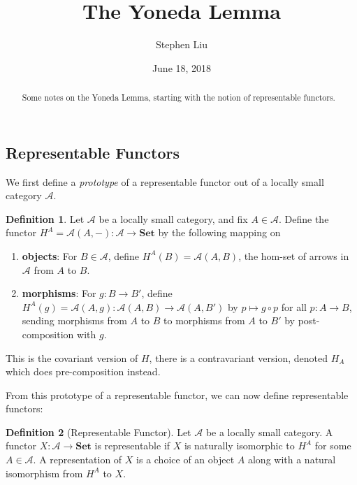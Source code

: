 \documentclass[11pt]{article}
\theoremstyle{definition}
\newtheorem*{defn}{Definition}
\theoremstyle{definition}
\theoremstyle{plain}
\theoremstyle{plain}
\theoremstyle{plain}
\begin{document}
\author{Stephen Liu}
\title{The Yoneda Lemma}
\date{June 18, 2018}

\maketitle

\begin{abstract}
Some notes on the Yoneda Lemma, starting with the notion of representable functors.
\end{abstract}

\subsection*{Representable Functors}

We first define a \emph{prototype} of a representable functor out of a locally small category $\mathscr{A}$.

\begin{defn}
Let $\mathscr{A}$ be a locally small category, and fix $A \in \mathscr{A}$. Define the functor $H^{A}=\mathscr{A}(A, -): \mathscr{A} \to \textbf{Set}$ by the following mapping on

\begin{enumerate}
\item \textbf{objects}: For $B \in \mathscr{A}$, define $H^{A}(B) = \mathscr{A}(A,B)$, the hom-set of arrows in $\mathscr{A}$ from $A$ to $B$.
\item \textbf{morphisms}: For $g:B \to B'$, define $H^{A}(g) = \mathscr{A}(A, g): \mathscr{A}(A,B) \to \mathscr{A}(A,B')$ by $p \mapsto g \circ p$ for all $p : A \to B$, sending morphisms from $A$ to $B$ to morphisms from $A$ to $B'$ by post-composition with $g$.
\end{enumerate}
\end{defn}

This is the covariant version of $H$, there is a contravariant version, denoted $H_{A}$ which does pre-composition instead.

From this prototype of a representable functor, we can now define representable functors:

\begin{defn}[Representable Functor]
Let $\mathscr{A}$ be a locally small category. A functor $X:\mathscr{A} \to \textbf{Set}$ is representable if $X$ is naturally isomorphic to $H^{A}$ for some $A \in \mathscr{A}$. A representation of $X$ is a choice of an object $A$ along with a natural isomorphism from $H^{A}$ to $X$.
\end{defn}
\end{document}
